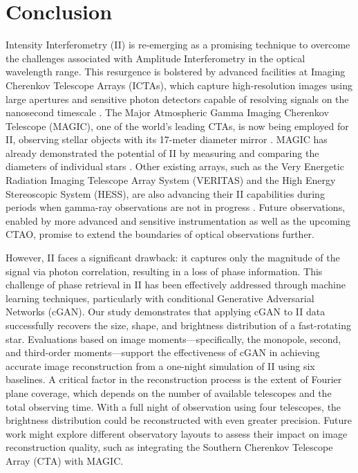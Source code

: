 \section{Conclusion}
Intensity Interferometry (II) is re-emerging as a promising technique to overcome the challenges associated with Amplitude Interferometry in the optical wavelength range. This resurgence is bolstered by advanced facilities at Imaging Cherenkov Telescope Arrays (ICTAs), which capture high-resolution images using large apertures and sensitive photon detectors capable of resolving signals on the nanosecond timescale \cite{dravins2013optical}. The Major Atmospheric Gamma Imaging Cherenkov Telescope (MAGIC), one of the world's leading CTAs, is now being employed for II, observing stellar objects with its 17-meter diameter mirror \cite{lorenz2004status}. MAGIC has already demonstrated the potential of II by measuring and comparing the diameters of individual stars \cite{abe2024performance}. Other existing arrays, such as the Very Energetic Radiation Imaging Telescope Array System (VERITAS) and the High Energy Stereoscopic System (HESS), are also advancing their II capabilities during periods when gamma-ray observations are not in progress \cite{kieda2021veritas, zmija2022optical}. Future observations, enabled by more advanced and sensitive instrumentation as well as the upcoming CTAO, promise to extend the boundaries of optical observations further.

However, II faces a significant drawback: it captures only the magnitude of the signal via photon correlation, resulting in a loss of phase information. This challenge of phase retrieval in II has been effectively addressed through machine learning techniques, particularly with conditional Generative Adversarial Networks (cGAN). Our study demonstrates that applying cGAN to II data successfully recovers the size, shape, and brightness distribution of a fast-rotating star. Evaluations based on image moments—specifically, the monopole, second, and third-order moments—support the effectiveness of cGAN in achieving accurate image reconstruction from a one-night simulation of II using six baselines. A critical factor in the reconstruction process is the extent of Fourier plane coverage, which depends on the number of available telescopes and the total observing time. With a full night of observation using four telescopes, the brightness distribution could be reconstructed with even greater precision. Future work might explore different observatory layouts to assess their impact on image reconstruction quality, such as integrating the Southern Cherenkov Telescope Array (CTA) with MAGIC.

